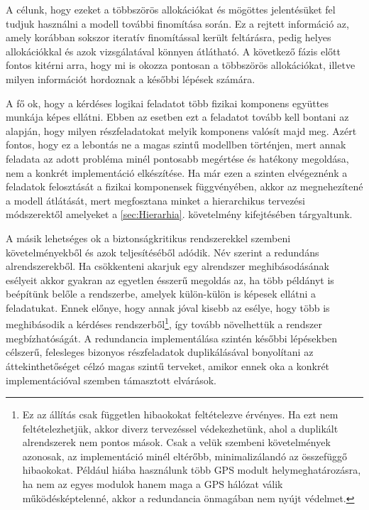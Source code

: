        A célunk, hogy ezeket a többszörös allokációkat és mögöttes jelentésüket fel tudjuk használni a modell további finomítása során. Ez a rejtett információ az, amely korábban sokszor iteratív finomítással került feltárásra, pedig helyes allokációkkal és azok vizsgálatával könnyen átlátható.
        A következő fázis előtt fontos kitérni arra, hogy mi is okozza pontosan a többszörös allokációkat, illetve milyen információt hordoznak a későbbi lépések számára.
        
        A fő ok, hogy a kérdéses logikai feladatot több fizikai komponens együttes munkája képes ellátni. Ebben az esetben ezt a feladatot tovább kell bontani az alapján, hogy milyen részfeladatokat melyik komponens valósít majd meg.
        Azért fontos, hogy ez a lebontás ne a magas szintű modellben történjen, mert annak feladata az adott probléma minél pontosabb megértése és hatékony megoldása, nem a konkrét implementáció elkészítése.
        Ha már ezen a szinten elvégeznénk a feladatok felosztását a fizikai komponensek függvényében, akkor az megnehezítené a modell átlátását, mert megfosztana minket a hierarchikus tervezési módszerektől amelyeket a \ref{sec:Hierarhia}. követelmény kifejtésében tárgyaltunk.
        
        A másik lehetséges ok a biztonságkritikus rendszerekkel szembeni követelményekből és azok teljesítéséből adódik. Név szerint a redundáns alrendszerekből. Ha csökkenteni akarjuk egy alrendszer meghibásodásának esélyeit akkor gyakran az egyetlen ésszerű megoldás az, ha több példányt is beépítünk belőle a rendszerbe, amelyek külön-külön is képesek ellátni a feladatukat.
        Ennek előnye, hogy annak jóval kisebb az esélye, hogy több is meghibásodik a kérdéses rendszerből\footnote{Ez az állítás csak független hibaokokat feltételezve érvényes. Ha ezt nem feltételezhetjük, akkor diverz tervezéssel védekezhetünk, ahol a duplikált alrendszerek nem pontos mások. Csak a velük szembeni követelmények azonosak, az implementáció minél eltérőbb, minimalizálandó az összefüggő hibaokokat. Például hiába használunk több GPS modult helymeghatározásra, ha nem az egyes modulok hanem maga a GPS hálózat válik működésképtelenné, akkor a redundancia önmagában nem nyújt védelmet.}, így tovább növelhettük a rendszer megbízhatóságát.
        A redundancia implementálása szintén későbbi lépésekben célszerű, felesleges bizonyos részfeladatok duplikálásával bonyolítani az áttekinthetőséget célzó magas szintű terveket, amikor ennek oka a konkrét implementációval szemben támasztott elvárások.

